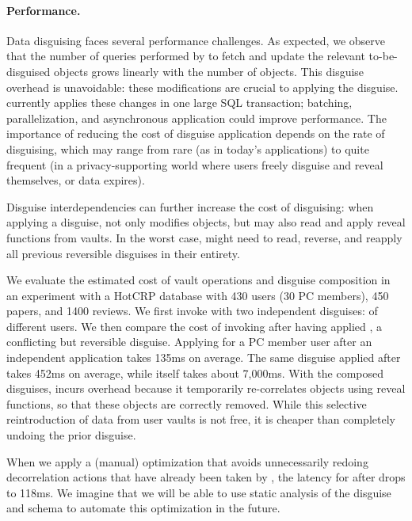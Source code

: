 \paragraph{Performance.}
\label{sec:perf}

Data disguising faces several performance challenges.
%
%
As expected, we observe that the number of queries performed by \sys to fetch and update
the relevant to-be-disguised objects grows linearly with the number of objects.
%
This disguise overhead is unavoidable: these modifications are crucial to applying the
disguise.
%
\sys currently applies these changes in one large SQL transaction; batching, parallelization,
and asynchronous application could improve performance.
%
The importance of reducing the cost of disguise application depends on the rate of
disguising, which may range from rare (as in today's applications) to quite frequent (in a
privacy-supporting world where users freely disguise and reveal themselves, or data expires).
%

%
Disguise interdependencies can further increase the cost of disguising: when applying a
disguise, \sys not only modifies objects, but may also read and apply reveal functions from
vaults.
%
In the worst case, \sys might need to read, reverse, and reapply all previous reversible
disguises in their entirety.
%

We evaluate the estimated cost of vault operations and disguise composition in an experiment
with a HotCRP database with 430 users (30 PC members), 450 papers, and 1400 reviews.
%
We first invoke \sys with two independent disguises: \hrtbf of different users.
%
We then compare the cost of invoking \hrtbf after having applied \hconfanon, a conflicting but reversible
disguise.
%
Applying \hrtbf for a PC member user after an independent \hrtbf application takes 135ms on
average.
%
The same \hrtbf disguise applied after \hconfanon takes 452ms on average,
while \hconfanon itself takes about 7,000ms.
%
With the composed disguises, \sys incurs overhead because it temporarily re-correlates objects
using reveal functions, so that these objects are correctly removed.
%
While this selective reintroduction of data from user vaults is not free, it is cheaper than
completely undoing the prior \hconfanon disguise.
%

%
When we apply a (manual) optimization that avoids unnecessarily redoing decorrelation
actions that have already been taken by \hconfanon, the latency for \hrtbf after \hconfanon
drops to 118ms.
%
We imagine that we will be able to use static analysis of the disguise and schema to automate
this optimization in the future.
%
